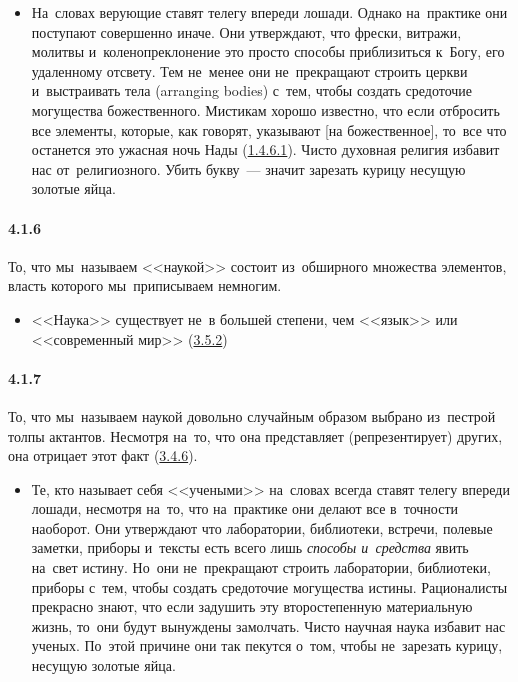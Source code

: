 	\begin{itemize}
	\item 
 На~словах верующие ставят телегу впереди лошади. Однако на~практике они поступают совершенно иначе. Они утверждают, что фрески, витражи, молитвы и~коленопреклонение это просто способы приблизиться к~Богу, его удаленному отсвету. Тем не~менее они не~прекращают строить церкви и~выстраивать тела (arranging bodies) с~тем, чтобы создать средоточие могущества божественного. Мистикам хорошо известно, что если отбросить все элементы, которые, как говорят, указывают [на божественное], то~все что останется это ужасная ночь Нады (\hyperlink{par:1.4.6.1}{1.4.6.1}). Чисто духовная религия избавит нас от~религиозного. Убить букву~--- значит зарезать курицу несущую золотые яйца.
	\end{itemize}	


\paragraph{4.1.6}\hypertarget{par:4.1.6}{} То, что мы~называем <<наукой>> состоит из~обширного множества элементов, власть которого мы~приписываем немногим. 
	\begin{itemize}
	\item 
	<<Наука>> существует не~в большей степени, чем <<язык>> или <<современный мир>> (\hyperlink{par:3.5.2}{3.5.2})
	\end{itemize}	


\paragraph{4.1.7}\hypertarget{par:4.1.7}{} То, что мы~называем наукой довольно случайным образом выбрано из~пестрой толпы актантов. Несмотря на~то, что она представляет (репрезентирует) других, она отрицает этот факт (\hyperlink{par:3.4.6}{3.4.6}). 
	\begin{itemize}
	\item 
	Те, кто называет себя <<учеными>> на~словах всегда ставят телегу впереди лошади, несмотря на~то, что на~практике они делают все в~точности наоборот. Они утверждают что лаборатории, библиотеки, встречи, полевые заметки, приборы и~тексты есть всего лишь {\itshape способы и~средства} явить на~свет истину. Но~они не~прекращают строить лаборатории, библиотеки, приборы с~тем, чтобы создать средоточие могущества истины. Рационалисты прекрасно знают, что если задушить эту второстепенную материальную жизнь, то~они будут вынуждены замолчать. Чисто научная наука избавит нас ученых. По~этой причине они так пекутся о~том, чтобы не~зарезать курицу, несущую золотые яйца.
	\end{itemize}	


